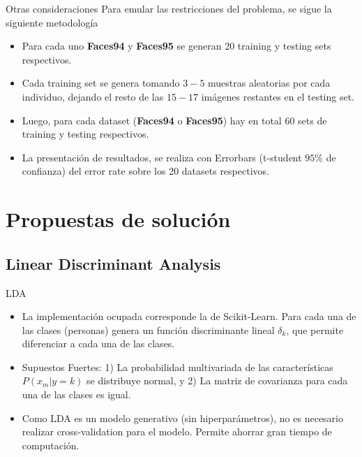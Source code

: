 \documentclass{beamer}
\begin{document}
\begin{frame}{Otras consideraciones}
 Para emular las restricciones del problema, se sigue la siguiente metodología
 \begin{itemize}
     \item Para cada uno \textbf{Faces94} y \textbf{Faces95} se generan 20 training y testing sets respectivos.
     \item Cada training set se genera tomando $3-5$ muestras aleatorias por cada individuo, dejando el resto de las $15-17$ imágenes restantes en el testing set.
     \item Luego, para cada dataset (\textbf{Faces94} o \textbf{Faces95}) hay en total $60$ sets de training y testing
     respectivos.
     \item La presentación de resultados, se realiza con Errorbars (t-student $95\%$ de confianza) del error rate sobre los 20 datasets respectivos.
 \end{itemize}
\end{frame}

\section{Propuestas de solución}

\subsection{Linear Discriminant Analysis}
\begin{frame}{LDA}
\begin{itemize}
    \item La implementación ocupada corresponde la de Scikit-Learn. Para cada una de las clases (personas) genera un función discriminante lineal $\delta_k$, que permite diferenciar a cada una de las clases.
    \item Supuestos Fuertes: 1) La probabilidad multivariada de las características $P(x_m | y=k)$ se distribuye normal, y  2) La matriz de covarianza para cada una de las clases es igual.
    \item Como LDA es un modelo generativo (sin hiperparámetros), no es necesario realizar cross-validation para el modelo. Permite ahorrar gran tiempo de computación.
\end{itemize}
\end{frame}
\end{document}
